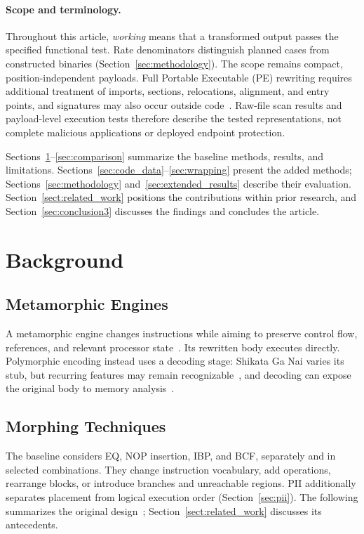 \documentclass[runningheads]{llncs}
\begin{document}
\paragraph{Scope and terminology.}\label{par:study_scope}
Throughout this article, \emph{working} means that a transformed output
passes the specified functional test. Rate denominators distinguish
planned cases from constructed binaries (Section~\ref{sec:methodology}).
The scope remains compact, position-independent payloads. Full Portable
Executable (PE) rewriting requires additional treatment of imports,
sections, relocations, alignment, and entry points, and signatures may
also occur outside code~\cite{sigdetPEnoncode}. Raw-file scan results and
payload-level execution tests therefore describe the tested representations,
not complete malicious applications or deployed endpoint protection.

Sections~\ref{sec:background}--\ref{sec:comparison} summarize the baseline
methods, results, and limitations. Sections~\ref{sec:code_data}--\ref{sec:wrapping}
present the added methods; Sections~\ref{sec:methodology} and~\ref{sec:extended_results}
describe their evaluation. Section~\ref{sect:related_work} positions the
contributions within prior research, and Section~\ref{sec:conclusion3}
discusses the findings and concludes the article.

\section{Background}\label{sec:background}

\subsection{Metamorphic Engines}\label{sub:meth}
A metamorphic engine changes instructions while aiming to preserve
control flow, references, and relevant processor
state~\cite{historycodeobf,identifyingmeth,metworm}. Its rewritten body
executes directly. Polymorphic encoding instead uses a decoding stage:
Shikata Ga Nai varies its stub, but recurring features may remain
recognizable~\cite{sgnstrong}, and decoding can expose the original body
to memory analysis~\cite{codeExtraction}.

\subsection{Morphing Techniques}
The baseline considers EQ, NOP insertion, IBP, and BCF, separately and in
selected combinations. They change instruction vocabulary, add operations,
rearrange blocks, or introduce branches and unreachable regions.
PII additionally separates placement from logical execution order
(Section~\ref{sec:pii}). The following summarizes the original
design~\cite{zone_secrypt_2026}; Section~\ref{sect:related_work} discusses
its antecedents.
\end{document}
